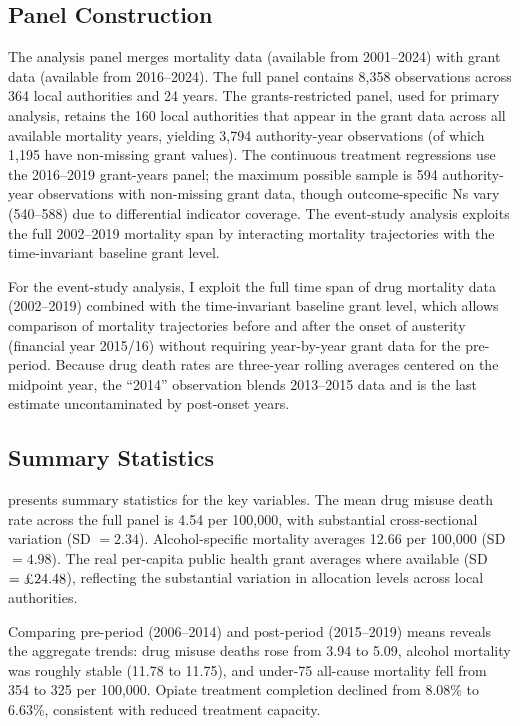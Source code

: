 \documentclass[12pt]{article}
\begin{document}
\subsection{Panel Construction}

The analysis panel merges mortality data (available from 2001--2024) with grant data (available from 2016--2024). The full panel contains 8,358 observations across 364 local authorities and 24 years. The grants-restricted panel, used for primary analysis, retains the 160 local authorities that appear in the grant data across all available mortality years, yielding 3,794 authority-year observations (of which 1,195 have non-missing grant values). The continuous treatment regressions use the 2016--2019 grant-years panel; the maximum possible sample is 594 authority-year observations with non-missing grant data, though outcome-specific Ns vary (540--588) due to differential indicator coverage. The event-study analysis exploits the full 2002--2019 mortality span by interacting mortality trajectories with the time-invariant baseline grant level.

For the event-study analysis, I exploit the full time span of drug mortality data (2002--2019) combined with the time-invariant baseline grant level, which allows comparison of mortality trajectories before and after the onset of austerity (financial year 2015/16) without requiring year-by-year grant data for the pre-period. Because drug death rates are three-year rolling averages centered on the midpoint year, the ``2014'' observation blends 2013--2015 data and is the last estimate uncontaminated by post-onset years.

\subsection{Summary Statistics}

 presents summary statistics for the key variables. The mean drug misuse death rate across the full panel is 4.54 per 100,000, with substantial cross-sectional variation (SD $= 2.34$). Alcohol-specific mortality averages 12.66 per 100,000 (SD $= 4.98$). The real per-capita public health grant averages  where available (SD $= \text{\textsterling}24.48$), reflecting the substantial variation in allocation levels across local authorities.

Comparing pre-period (2006--2014) and post-period (2015--2019) means reveals the aggregate trends: drug misuse deaths rose from 3.94 to 5.09, alcohol mortality was roughly stable (11.78 to 11.75), and under-75 all-cause mortality fell from 354 to 325 per 100,000. Opiate treatment completion declined from 8.08\% to 6.63\%, consistent with reduced treatment capacity.
\end{document}
